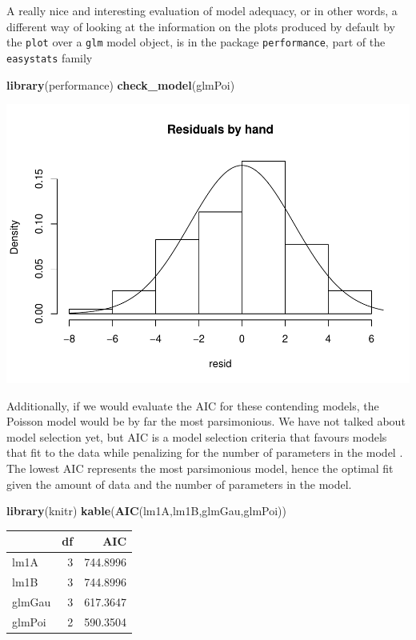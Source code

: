\documentclass[
]{book}
\newenvironment{Shaded}{\begin{snugshade}}{\end{snugshade}}
\newcommand{\FunctionTok}[1]{\textcolor[rgb]{0.13,0.29,0.53}{\textbf{#1}}}
\newcommand{\NormalTok}[1]{#1}
\begin{document}
A really nice and interesting evaluation of model adequacy, or in other words, a different way of looking at the information on the plots produced by default by the \texttt{plot} over a \texttt{glm} model object, is in the package \texttt{performance}, part of the \texttt{easystats} family

\begin{Shaded}
\begin{Highlighting}[]
\FunctionTok{library}\NormalTok{(performance)}
\FunctionTok{check\_model}\NormalTok{(glmPoi)}
\end{Highlighting}
\end{Shaded}

\includegraphics{ECOMODbook_files/figure-latex/unnamed-chunk-11-1.pdf}

Additionally, if we would evaluate the AIC for these contending models, the Poisson model would be by far the most parsimonious. We have not talked about model selection yet, but AIC is a model selection criteria that favours models that fit to the data while penalizing for the number of parameters in the model \citep[e.g.][]{Aho2014}. The lowest AIC represents the most parsimonious model, hence the optimal fit given the amount of data and the number of parameters in the model.

\begin{Shaded}
\begin{Highlighting}[]
\FunctionTok{library}\NormalTok{(knitr)}
\FunctionTok{kable}\NormalTok{(}\FunctionTok{AIC}\NormalTok{(lm1A,lm1B,glmGau,glmPoi))}
\end{Highlighting}
\end{Shaded}

\begin{tabular}{l|r|r}
\hline
  & df & AIC\\
\hline
lm1A & 3 & 744.8996\\
\hline
lm1B & 3 & 744.8996\\
\hline
glmGau & 3 & 617.3647\\
\hline
glmPoi & 2 & 590.3504\\
\hline
\end{tabular}
\end{document}
